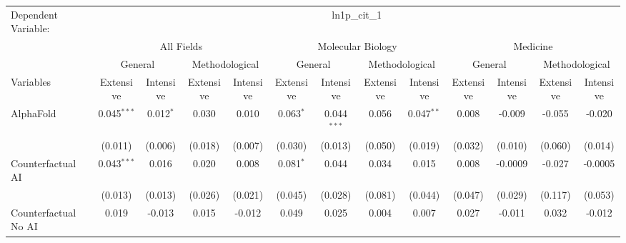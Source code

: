\begingroup
\centering
\begin{tabular}{lcccccccccccc}
   \tabularnewline \midrule \midrule
   Dependent Variable: & \multicolumn{12}{c}{ln1p\_cit\_1}\\
 & \multicolumn{4}{c}{All Fields} & \multicolumn{4}{c}{Molecular Biology} & \multicolumn{4}{c}{Medicine} \\
\cmidrule(lr){2-5} \cmidrule(lr){6-9} \cmidrule(lr){10-13}
 & \multicolumn{2}{c}{General} & \multicolumn{2}{c}{Methodological} & \multicolumn{2}{c}{General} & \multicolumn{2}{c}{Methodological} & \multicolumn{2}{c}{General} & \multicolumn{2}{c}{Methodological} \\
\cmidrule(lr){2-3} \cmidrule(lr){4-5} \cmidrule(lr){6-7} \cmidrule(lr){8-9} \cmidrule(lr){10-11} \cmidrule(lr){12-13}
Variables & \multicolumn{1}{c}{Extensive} & \multicolumn{1}{c}{Intensive} & \multicolumn{1}{c}{Extensive} & \multicolumn{1}{c}{Intensive} & \multicolumn{1}{c}{Extensive} & \multicolumn{1}{c}{Intensive} & \multicolumn{1}{c}{Extensive} & \multicolumn{1}{c}{Intensive} & \multicolumn{1}{c}{Extensive} & \multicolumn{1}{c}{Intensive} & \multicolumn{1}{c}{Extensive} & \multicolumn{1}{c}{Intensive} \\
\cmidrule(lr){1-1}\cmidrule(lr){2-2} \cmidrule(lr){3-3} \cmidrule(lr){4-4} \cmidrule(lr){5-5} \cmidrule(lr){6-6} \cmidrule(lr){7-7} \cmidrule(lr){8-8} \cmidrule(lr){9-9} \cmidrule(lr){10-10} \cmidrule(lr){11-11} \cmidrule(lr){12-12} \cmidrule(lr){13-13}
   AlphaFold                                & 0.045$^{***}$  & 0.012$^{*}$ & 0.030   & 0.010   & 0.063$^{*}$    & 0.044$^{***}$  & 0.056        & 0.047$^{**}$ & 0.008   & -0.009        & -0.055  & -0.020\\   
                                            & (0.011)        & (0.006)     & (0.018) & (0.007) & (0.030)        & (0.013)        & (0.050)      & (0.019)      & (0.032) & (0.010)       & (0.060) & (0.014)\\   
   Counterfactual AI                        & 0.043$^{***}$  & 0.016       & 0.020   & 0.008   & 0.081$^{*}$    & 0.044          & 0.034        & 0.015        & 0.008   & -0.0009       & -0.027  & -0.0005\\   
                                            & (0.013)        & (0.013)     & (0.026) & (0.021) & (0.045)        & (0.028)        & (0.081)      & (0.044)      & (0.047) & (0.029)       & (0.117) & (0.053)\\   
   Counterfactual No AI                     & 0.019          & -0.013      & 0.015   & -0.012  & 0.049          & 0.025          & 0.004        & 0.007        & 0.027   & -0.011        & 0.032   & -0.012\\   

\end{tabular}
